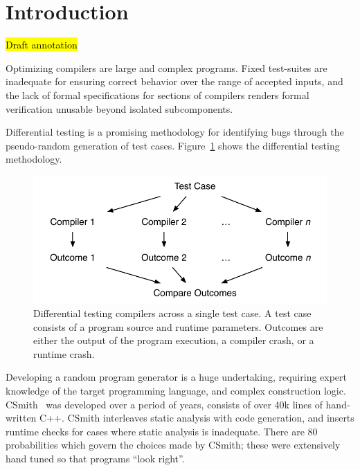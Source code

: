\section{Introduction}\label{sec:intro}

\hl{Draft annotation}

\noindent
Optimizing compilers are large and complex programs. Fixed test-suites are inadequate for ensuring correct behavior over the range of accepted inputs, and the lack of formal specifications for sections of compilers renders formal verification unusable beyond isolated subcomponents.

Differential testing is a promising methodology for identifying bugs through the pseudo-random generation of test cases. Figure~\ref{fig:difftest} shows the differential testing methodology.

\begin{figure}
	\centering
	\includegraphics[width=.9\columnwidth]{img/difftest} %
	\caption{%
		Differential testing compilers across a single test case. A test case consists of a program source and runtime parameters. Outcomes are either the output of the program execution, a compiler crash, or a runtime crash.%
	}%
	\label{fig:difftest}
\end{figure}

Developing a random program generator is a huge undertaking, requiring expert knowledge of the target programming language, and complex construction logic. CSmith~\cite{Yang2011} was developed over a period of years, consists of over 40k lines of hand-written C++. CSmith interleaves static analysis with code generation, and inserts runtime checks for cases where static analysis is inadequate. There are 80 probabilities which govern the choices made by CSmith; these were extensively hand tuned so that programs ``look right''.

